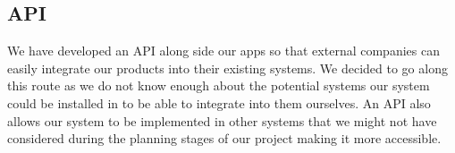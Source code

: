 \documentclass{article}
\begin{document}
    \subsection{API}
    We have developed an API along side our apps so that external companies can easily integrate our products into their existing systems. We decided to go along this route as we do not know enough about the potential systems our system could be installed in to be able to integrate into them ourselves. An API also allows our system to be implemented in other systems that we might not have considered during the planning stages of our project making it more accessible.
\end{document}
